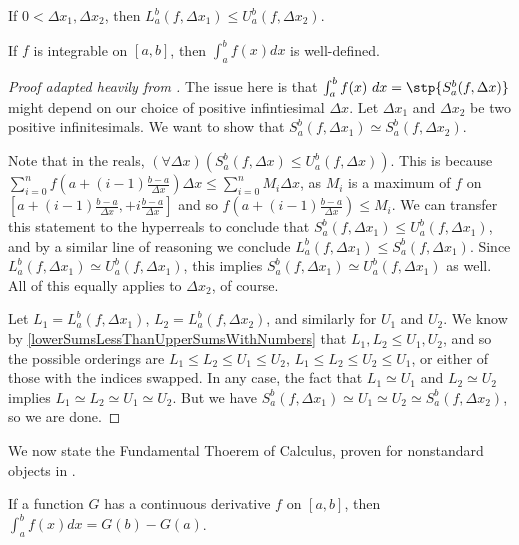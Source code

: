 \begin{corollary}\label{lowerSumsLessThanUpperSumsWithNumbers}
    If $0 < \Delta x_1, \Delta x_2$, then $L_a^b(f, \Delta x_1) \leq U_a^b(f, \Delta x_2)$.
\end{corollary}

\begin{thm}
    If $f$ is integrable on $[a, b]$, then $\int_a^b f(x)dx$ is well-defined.
\end{thm}

\begin{proof}[Proof adapted heavily from ]
    The issue here is that $\int_a^b f(x)\ dx = \stp{S_a^b(f, \Delta x)}$ might depend on our choice of positive infintiesimal $\Delta x$. Let $\Delta x_1$ and $\Delta x_2$ be two positive infinitesimals. We want to show that $S_a^b(f, \Delta x_1) \simeq S_a^b(f, \Delta x_2)$.

    Note that in the reals, $(\forall \Delta x)(S_a^b(f, \Delta x) \leq U_a^b(f, \Delta x))$. This is because $\sum_{i=0}^n f(a + (i-1)\frac{b-a}{\Delta x})\Delta x \leq \sum_{i=0}^n M_i \Delta x$, as $M_i$ is a maximum of $f$ on $[a + (i-1)\frac{b-a}{\Delta x},  + i\frac{b-a}{\Delta x}]$ and so $f(a + (i-1)\frac{b-a}{\Delta x}) \leq M_i$. We can transfer this statement to the hyperreals to conclude that $S_a^b(f, \Delta x_1) \leq U_a^b(f, \Delta x_1)$, and by a similar line of reasoning we conclude $L_a^b(f, \Delta x_1) \leq S_a^b(f, \Delta x_1)$. Since $L_a^b(f, \Delta x_1) \simeq U_a^b(f, \Delta x_1)$, this implies $S_a^b(f, \Delta x_1) \simeq U_a^b(f, \Delta x_1)$ as well. All of this equally applies to $\Delta x_2$, of course.

    Let $L_1 = L_a^b(f, \Delta x_1)$, $L_2 = L_a^b(f, \Delta x_2)$, and similarly for $U_1$ and $U_2$. We know by \autoref{lowerSumsLessThanUpperSumsWithNumbers} that $L_1, L_2 \leq U_1, U_2$, and so the possible orderings are $L_1 \leq L_2 \leq U_1 \leq U_2$, $L_1 \leq L_2 \leq U_2 \leq U_1$, or either of those with the indices swapped. In any case, the fact that $L_1 \simeq U_1$ and $L_2 \simeq U_2$ implies $L_1 \simeq L_2 \simeq U_1 \simeq U_2$. But we have $S_a^b(f, \Delta x_1) \simeq U_1 \simeq U_2 \simeq S_a^b(f, \Delta x_2)$, so we are done.
\end{proof}

We now state the Fundamental Thoerem of Calculus, proven for nonstandard objects in \cite[111-112]{goldblatt1998}. 

\begin{thm}\label{fundamentalTheoremCalculus}
    If a function $G$ has a continuous derivative $f$ on $[a, b]$, then $\int_a^b f(x) dx = G(b) - G(a)$.
\end{thm}



